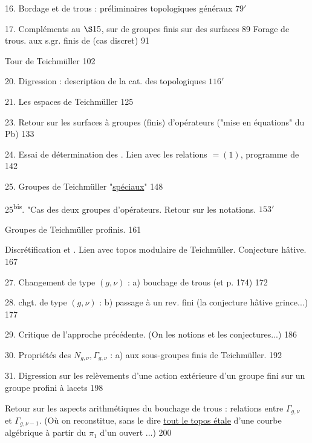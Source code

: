 16. Bordage et  de trous : préliminaires topologiques généraux
\hfill \(79'\)

17. Compléments au \(\S 15\), sur  de groupes finis
sur des surfaces \hfill 89
 Forage de trous.  aux s.gr.
finis de 
(cas discret) \hfill 91

 Tour de Teichmüller \hfill 102

20. Digression : description 
de la cat. des  topologiques \hfill \(116'\)

21. Les espaces de Teichmüller \hfill 125


23. Retour sur les surfaces à groupes (finis) d'opérateurs
("mise en équations" du Pb) \hfill 133

24. Essai de détermination des . Lien avec les relations
 \(=(1)\),
programme de  \hfill 142

25. Groupes de Teichmüller "\uline{spéciaux}" \hfill 148

25\textsuperscript{bis}. "Cas des deux groupes d'opérateurs. Retour sur les notations.
\hfill \(153'\)

 Groupes de Teichmüller profinis. \hfill 161

Discrétification et . Lien avec topos
modulaire de Teichmüller. Conjecture hâtive. \hfill 167

27. Changement de type \((g,\nu)\) : a) bouchage de trous
(et  p. 174) \hfill 172

28. chgt. de type \((g,\nu)\) : b) passage à un rev. fini
(la conjecture hâtive grince...) \hfill 177

29. Critique de l'approche précédente. (On 
les notions et les conjectures...) \hfill 186

30. Propriétés des \(N_{g,\nu},\Gamma_{g,\nu}\) : a)
 aux sous-groupes finis de Teichmüller.
\hfill 192

31. Digression sur les relèvements d'une action extérieure d'un groupe
fini sur un groupe profini à lacets \hfill 198

 Retour sur les aspects arithmétiques du bouchage de trous :
relations entre \(\Gamma_{g,\nu}\) et \(\Gamma_{g,\nu-1}\).
(Où on reconstitue, sans le dire \uline{tout le topos étale} d'une
courbe algébrique  à partir du \(\pi_1\) d'un
ouvert ...) \hfill 200


